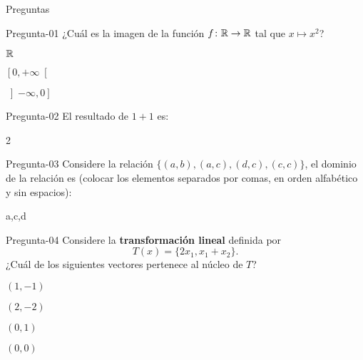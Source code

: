 \documentclass[a4,11pt]{aleph-notas-beta}
\begin{document}
\begin{quiz}{Preguntas}

\begin{multi}[%
    feedback={La respuesta correcta es $\left[0,+\infty\right[$}
    ]%
    {Pregunta-01}
    ¿Cuál es la imagen de la función $f\colon \mathbb{R} \rightarrow \mathbb{R}$ tal que $x\mapsto x^2$?
    \item $\mathbb{R}$
    \item* $\left[0,+\infty\right[$
    \item $\left]-\infty,0\right]$
\end{multi}

\begin{numerical}[tolerance=0.1,%
    feedback={La suma es igual a $2$.}
    ]%
    {Pregunta-02}
    El resultado de $1+1$ es:
    \item 2
\end{numerical}

\begin{shortanswer}[%
    feedback={El dominio de la relación es $\{a,c,d\}$}
    ]%
    {Pregunta-03}
    Considere la relación $\{(a,b), (a,c), (d,c), (c,c)\}$, el dominio de la relación es (colocar los elementos separados por comas, en orden alfabético y sin espacios):
    \item a,c,d
\end{shortanswer}


\begin{multi}[%
    feedback={Para cumplir la restricción del problema, necesitamos que $d((a,1),(1,-1)) = d((a,1),(-1,1))$, es decir, necesitamos que $\mathbb{R}$
    \[
        \sqrt{(a-1)^2+(1-(-1))^2}=\sqrt{(a-(-1))^2+(1-1)^2},
    \]
    cuya solución es $a=1$.}]%
    {Pregunta-04}
    Considere la \textbf{transformación lineal} definida por
    \[
        T(x) = \{2x_1,x_1+x_2\}.
    \]
    ¿Cuál de los siguientes vectores pertenece al núcleo de $T$?
    \item $(1,-1)$
    \item $(2,-2)$
    \item $(0,1)$
    \item* $(0,0)$
\end{multi}



\end{quiz}
\end{document}
